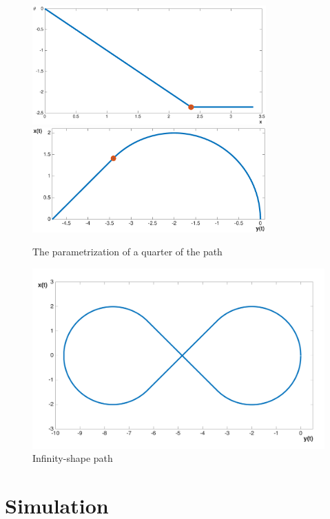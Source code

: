 \begin{figure}[!htbp]
  \centering
 {\includegraphics[width=0.8\textwidth]{img/angle_x.eps}\label{fig:quarter_theta}}
  \hfill
  {\includegraphics[width=0.8\textwidth]{img/path_x_quarter.eps}\label{fig:quarter_xy}}
  \caption{The parametrization of a quarter of the path}
  \label{fig:quarter_path}
\end{figure}

\begin{figure}[!htbp]
    \centering
    \includegraphics[width=1\textwidth]{img/infinityshapepath.png}
    \caption{Infinity-shape path}
    \label{fig:entire_path}
\end{figure}

\section{Simulation}


